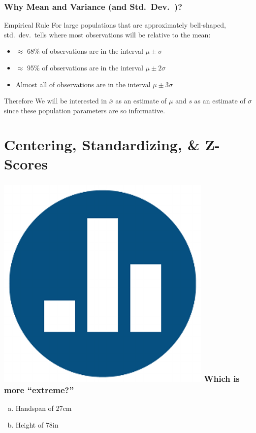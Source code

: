 \begin{frame}
\frametitle{Why Mean and Variance (and Std.\ Dev.\ )?}
\begin{alertblock}{Empirical Rule}
For large populations that are approximately bell-shaped, std.\ dev.\ tells where most observations will be relative to the mean:
	\begin{itemize}
		\item $\approx$ 68\% of observations are in the interval $\mu \pm \sigma$
		\item $\approx$ 95\% of observations are in the interval $\mu \pm 2\sigma$
		\item Almost all of observations are in the interval $\mu \pm 3\sigma$
	\end{itemize}
\end{alertblock}
\pause

\begin{block}{Therefore}
We will be interested in $\bar{x}$ as an estimate of $\mu$ and $s$ as an estimate of $\sigma$ since these population parameters are so informative.
\end{block}
\end{frame}
\section{Centering, Standardizing, \& Z-Scores}
\begin{frame}

\frametitle{\includegraphics[scale = 0.05]{./images/clicker} \hfill Which is more ``extreme?''}
	\begin{enumerate}[(a)]
		\item Handspan of 27cm
		\item Height of 78in
	\end{enumerate}

\end{frame}


